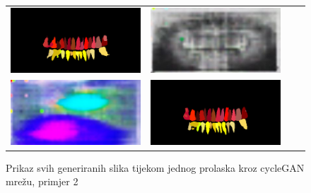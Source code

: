 \begin{figure}
\begin{tabular}{cccc}
\hspace{-1.5cm}
{\includegraphics[width = 8cm]{slike/rezultati/train2a.png}} &
{\includegraphics[width = 8cm]{slike/rezultati/train2b.jpg}}\\
\hspace{-1.5cm}
{\includegraphics[width = 8cm]{slike/rezultati/train2c.jpg}} &
{\includegraphics[width = 8cm]{slike/rezultati/train2d.png}}\\
\end{tabular}
\caption{Prikaz svih generiranih slika tijekom jednog prolaska kroz cycleGAN mrežu, primjer 2}
\end{figure}









